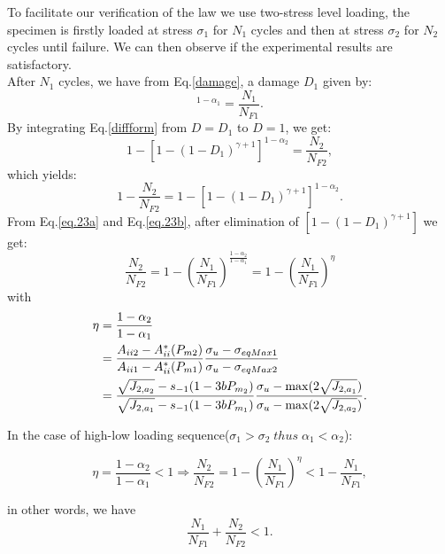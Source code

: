 To facilitate our verification of the law we use two-stress level loading, the specimen is firstly loaded at stress $\sigma_1$ for $N_1$ cycles and then at stress $\sigma_2$ for $N_2$ cycles until failure. We can then observe if the experimental results are satisfactory.\\
After $N_1$ cycles, we have from Eq.\eqref{damage}, a damage $D_1$ given by:
\begin{equation}
[1-(1-D_1)^{\gamma+1}]^{1-\alpha_1}=\frac{N_1}{N_{F1}}.
\label{eq.23a}
\end{equation}
By integrating Eq.\eqref{diffform} from $D=D_1$ to $D=1$, we get:
\begin{equation}
1-[1-(1-D_1)^{\gamma+1}]^{1-\alpha_2}=\frac{N_2}{N_{F2}},
\end{equation}
which yields:
\begin{equation}1-\frac{N_2}{N_{F2}}=1-[1-(1-D_1)^{\gamma+1}]^{1-\alpha_2}.
\label{eq.23b}
\end{equation}
From Eq.\eqref{eq.23a} and Eq.\eqref{eq.23b}, after elimination of $[1-(1-D_1)^{\gamma+1}]$ we get:
\begin{equation} \frac{N_2}{N_{F2}}=1-(\frac{N_1}{N_{F1}})^\frac{1-\alpha_2}{1-\alpha_1}=1-(\frac{N_1}{N_{F1}})^\eta\end{equation}
with
\begin{equation}
		\begin{split}
			\eta&=\frac{1-\alpha_2}{1-\alpha_1}
			\\&=\frac{A_{\uppercase\expandafter{\romannumeral2 2}} - A_{\uppercase\expandafter{\romannumeral2}}^\ast(P_{m2})}{A_{\uppercase\expandafter{\romannumeral2 1}} - A_{\uppercase\expandafter{\romannumeral2}}^\ast(P_{m1})}\frac{ \sigma_{u} - \sigma_{eqMax1}}{ \sigma_{u} - \sigma_{eqMax2}}
			\\&=\frac{\sqrt{J_{2,a_2}} - s_{-1}(1-3bP_{m_2})}{\sqrt{J_{2,a_1}} - s_{-1}(1-3bP_{m_1})}\frac{ \sigma_{u} - \max(2\sqrt{J_{2,a_1}})}{  \sigma_{u} - \max(2\sqrt{J_{2,a_2}})}.
	\end{split}
\label{eq.etachaboche}
\end{equation}

In the case of high-low loading sequence($\sigma_1>\sigma_2 \; thus \; \alpha_1<\alpha_2$):

$$\eta=\frac{1-\alpha_2}{1-\alpha_1}<1\Rightarrow \frac{N_2}{N_{F2}}=1-(\frac{N_1}{N_{F1}})^\eta<1-\frac{N_1}{N_{F1}},$$

in other words, we have 
$$\frac{N_1}{N_{F1}}+\frac{N_2}{N_{F2}}<1.$$

